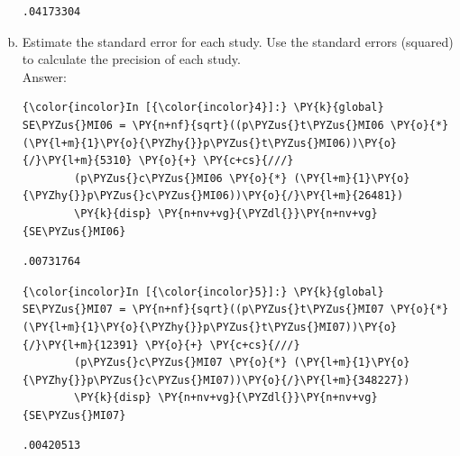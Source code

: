 \documentclass[11pt,notitlepage]{article}\usepackage[]{graphicx}\usepackage[]{color}
\makeatletter
\newenvironment{kframe}{%
 \def\at@end@of@kframe{}%
 \ifinner\ifhmode%
  \def\at@end@of@kframe{\end{minipage}}%
  \begin{minipage}{\columnwidth}%
 \fi\fi%
 \def\FrameCommand##1{\hskip\@totalleftmargin \hskip-\fboxsep
 \colorbox{shadecolor}{##1}\hskip-\fboxsep
     \hskip-\linewidth \hskip-\@totalleftmargin \hskip\columnwidth}%
 \MakeFramed {\advance\hsize-\width
   \@totalleftmargin\z@ \linewidth\hsize
   \@setminipage}}%
 {\par\unskip\endMakeFramed%
 \at@end@of@kframe}
\newenvironment{knitrout}{}{} %
\makeatother
\begin{document}
\begin{enumerate}[a)]
\begin{knitrout}
\begin{kframe}
    \begin{Verbatim}[commandchars=\\\{\}]
.04173304

    \end{Verbatim}

\end{kframe}
\end{knitrout}



\item Estimate the standard error for each study. Use the standard errors (squared) to calculate the precision of each study.\\
Answer:\\
\begin{knitrout}
\color{fgcolor}\begin{kframe}
    \begin{Verbatim}[commandchars=\\\{\}]
{\color{incolor}In [{\color{incolor}4}]:} \PY{k}{global} SE\PYZus{}MI06 = \PY{n+nf}{sqrt}((p\PYZus{}t\PYZus{}MI06 \PY{o}{*} (\PY{l+m}{1}\PY{o}{\PYZhy{}}p\PYZus{}t\PYZus{}MI06))\PY{o}{/}\PY{l+m}{5310} \PY{o}{+} \PY{c+cs}{///}
        (p\PYZus{}c\PYZus{}MI06 \PY{o}{*} (\PY{l+m}{1}\PY{o}{\PYZhy{}}p\PYZus{}c\PYZus{}MI06))\PY{o}{/}\PY{l+m}{26481})
        \PY{k}{disp} \PY{n+nv+vg}{\PYZdl{}}\PY{n+nv+vg}{SE\PYZus{}MI06}
\end{Verbatim}

    \begin{Verbatim}[commandchars=\\\{\}]
.00731764

    \end{Verbatim}

    \begin{Verbatim}[commandchars=\\\{\}]
{\color{incolor}In [{\color{incolor}5}]:} \PY{k}{global} SE\PYZus{}MI07 = \PY{n+nf}{sqrt}((p\PYZus{}t\PYZus{}MI07 \PY{o}{*} (\PY{l+m}{1}\PY{o}{\PYZhy{}}p\PYZus{}t\PYZus{}MI07))\PY{o}{/}\PY{l+m}{12391} \PY{o}{+} \PY{c+cs}{///}
        (p\PYZus{}c\PYZus{}MI07 \PY{o}{*} (\PY{l+m}{1}\PY{o}{\PYZhy{}}p\PYZus{}c\PYZus{}MI07))\PY{o}{/}\PY{l+m}{348227})
        \PY{k}{disp} \PY{n+nv+vg}{\PYZdl{}}\PY{n+nv+vg}{SE\PYZus{}MI07}
\end{Verbatim}

    \begin{Verbatim}[commandchars=\\\{\}]
.00420513


\end{Verbatim}
\end{kframe}
\end{knitrout}
\end{enumerate}
\end{document}
